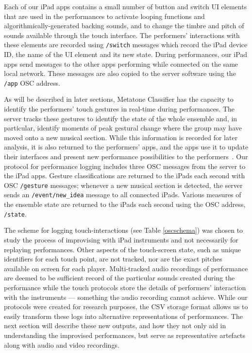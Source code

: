 \documentclass[graybox]{svmult}
\begin{document}
Each of our iPad apps contains a small number of button and switch UI
elements that are used in the performances to activate looping
functions and algorithmically-generated backing sounds, and to change the
timbre and pitch of sounds available through the touch interface. The
performers' interactions with these elements are recorded using
\texttt{/switch} messages which record the iPad device ID, the name of
the UI element and its new state. During performances, our iPad apps
send messages to the other apps performing while connected on the same
local network. These messages are also copied to the server software
using the \texttt{/app} OSC address.

As will be described in later sections, Metatone Classifier has the
capacity to identify the performers' touch gestures in real-time
during performances. The server tracks these gestures to identify the
state of the whole ensemble and, in particular, identify moments
of peak gestural change where the group may have moved onto a new
musical section. While this information is recorded for later
analysis, it is also returned to the performers' apps, and the apps use it to
update their interfaces and present new performance possibilities to
the performers~\cite{Martin:2015jk}. Our protocol for performance
logging includes three OSC messages from the server to the iPad apps.
Gesture classifications are returned to the iPads each second with OSC
\texttt{/gesture} messages; whenever a new musical section is
detected, the server sends an \texttt{/event/new\_idea} message to all
connected iPads. Various measures of the ensemble state are
returned to the iPads each second using the OSC address,
\texttt{/state}.

The scheme for logging touch-interactions (see Table \ref{oscschema})
was chosen to study the process of improvising with iPad instruments
and not necessarily for replaying performances. Other aspects of the
touch-screen state, such as unique identifiers for each touch point, are
not tracked, nor are the exact pitches available on screen for each
player. Multi-tracked audio recordings of performance are deemed to be
sufficient record of the particular sounds created during the
performance while the touch protocols store the details of performers'
interaction with the instruments --- something the audio recording cannot achieve.
While our protocols were created for research purposes, the CSV
storage format allows us to easily transform these logs into
alternative representations of performances. The next section will
describe these new outputs, and how they not only aid in understanding
the improvised performances, but serve as representative artefacts
along with audio and video recordings.
\end{document}
